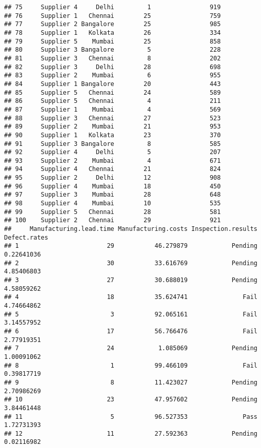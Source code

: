 \documentclass[
]{article}
\begin{document}
\begin{verbatim}
## 75     Supplier 4     Delhi         1                919
## 76     Supplier 1   Chennai        25                759
## 77     Supplier 2 Bangalore        25                985
## 78     Supplier 1   Kolkata        26                334
## 79     Supplier 5    Mumbai        25                858
## 80     Supplier 3 Bangalore         5                228
## 81     Supplier 3   Chennai         8                202
## 82     Supplier 3     Delhi        28                698
## 83     Supplier 2    Mumbai         6                955
## 84     Supplier 1 Bangalore        20                443
## 85     Supplier 5   Chennai        24                589
## 86     Supplier 5   Chennai         4                211
## 87     Supplier 1    Mumbai         4                569
## 88     Supplier 3   Chennai        27                523
## 89     Supplier 2    Mumbai        21                953
## 90     Supplier 1   Kolkata        23                370
## 91     Supplier 3 Bangalore         8                585
## 92     Supplier 4     Delhi         5                207
## 93     Supplier 2    Mumbai         4                671
## 94     Supplier 4   Chennai        21                824
## 95     Supplier 2     Delhi        12                908
## 96     Supplier 4    Mumbai        18                450
## 97     Supplier 3    Mumbai        28                648
## 98     Supplier 4    Mumbai        10                535
## 99     Supplier 5   Chennai        28                581
## 100    Supplier 2   Chennai        29                921
##     Manufacturing.lead.time Manufacturing.costs Inspection.results Defect.rates
## 1                        29           46.279879            Pending   0.22641036
## 2                        30           33.616769            Pending   4.85406803
## 3                        27           30.688019            Pending   4.58059262
## 4                        18           35.624741               Fail   4.74664862
## 5                         3           92.065161               Fail   3.14557952
## 6                        17           56.766476               Fail   2.77919351
## 7                        24            1.085069            Pending   1.00091062
## 8                         1           99.466109               Fail   0.39817719
## 9                         8           11.423027            Pending   2.70986269
## 10                       23           47.957602            Pending   3.84461448
## 11                        5           96.527353               Pass   1.72731393
## 12                       11           27.592363            Pending   0.02116982

\end{verbatim}
\end{document}

